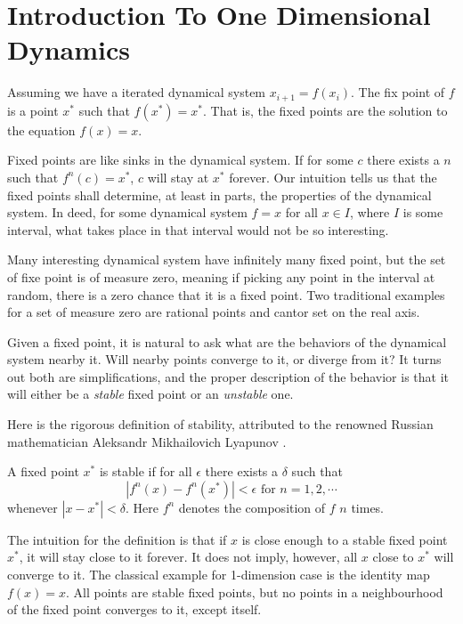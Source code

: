 \section{Introduction To One Dimensional Dynamics}

\begin{defn}
	Assuming we have a iterated dynamical system $x_{i+1} = f(x_i)$. 
	The fix point of $f$ is a point $x^*$ such that $f(x^*) = x^*$. 
	That is, the fixed points are the solution to the equation $f(x) = x$.
\end{defn}

Fixed points are like sinks in the dynamical system. 
If for some $c$ there exists a $n$ such that $f^n(c) = x^*$, $c$ will stay at $x^*$ forever. 
Our intuition tells us that the fixed points shall determine, at least in parts, the properties of the dynamical system.
In deed, for some dynamical system $f = x$ for all $x \in I$, where $I$ is some interval, what takes place in that interval would not be so interesting.

Many interesting dynamical system have infinitely many fixed point, but the set of fixe point is of measure zero, meaning if picking any point in the interval at random, there is a zero chance that it is a fixed point.
Two traditional examples for a set of measure zero are rational points and cantor set on the real axis. 

Given a fixed point, it is natural to ask what are the behaviors of the dynamical system nearby it.
Will nearby points converge to it, or diverge from it?
It turns out both are simplifications, and the proper description of the behavior is that it will either be a \emph{stable} fixed point or an \emph{unstable} one. 

Here is the rigorous definition of stability, attributed to the renowned Russian mathematician Aleksandr Mikhailovich Lyapunov \cite{lyapunov}.

\begin{defn}
A fixed point $x^*$ is stable if for all $\epsilon$ there exists a $\delta$ such that 
$$
	|f^n(x) - f^n(x^*)| < \epsilon \text{ for } n = 1,2, \cdots 
$$
whenever $|x - x^*| < \delta$.
Here $f^n$ denotes the composition of $f$ $n$ times.
\end{defn}

The intuition for the definition is that if $x$ is close enough to a stable fixed point $x^*$, it will stay close to it forever. 
It does not imply, however, all $x$ close to $x^*$ will converge to it.
The classical example for 1-dimension case is the identity map $f(x) = x$. 
All points are stable fixed points, but no points in a neighbourhood of the fixed point converges to it, except itself.

